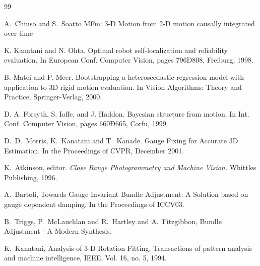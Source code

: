 \documentclass[conference]{IEEEtran}
\begin{document}
\begin{thebibliography}{99}

A.~Chiuso and S.~Soatto
\newblock MFm: 3-D Motion from 2-D motion causally integrated over time

K. Kanatani and N. Ohta.
\newblock Optimal robot self-localization and reliability evaluation. 
\newblock In European Conf. Computer Vision, pages 796Ð808, Freiburg, 1998.

B. Matei and P. Meer.
\newblock Bootstrapping a heteroscedastic regression model with application to 3D rigid motion evaluation.
\newblock In Vision Algorithms: Theory and Practice. Springer-Verlag, 2000. 

D. A. Forsyth, S. Ioffe, and J. Haddon.
\newblock Bayesian structure from motion.
\newblock In Int. Conf. Computer Vision, pages 660Ð665, Corfu, 1999. 

D.~D.~Morris, K.~Kanatani and T.~Kanade.
\newblock Gauge Fixing for Accurate 3D Estimation.
\newblock In the Proceedings of CVPR, December 2001.

K.~Atkinson, editor. {\em Close Range Photogrammetry and Machine Vision.}
\newblock Whittles Publishing, 1996.

A.~Bartoli,
\newblock Towards Gauge Invariant Bundle Adjustment: A Solution based on gauge dependent damping.
\newblock In the Proceedings of ICCV03.

B.~Triggs, P.~McLauchlan and R.~Hartley and A.~Fitzgibbon,
\newblock Bundle Adjustment - A Modern Synthesis.

K.~Kanatani,
\newblock Analysis of 3-D Rotation Fitting,
\newblock Transactions of pattern analysis and machine intelligence, IEEE, Vol. 16, no. 5, 1994.


\end{thebibliography}
\end{document}
